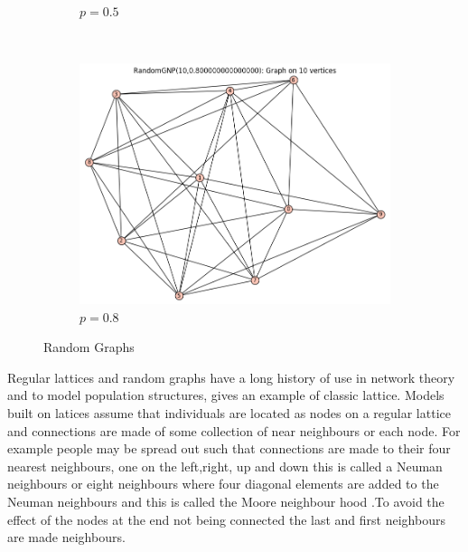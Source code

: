 \begin{figure}[h]
\begin{subfigure}[b]{0.3\textwidth}
        \caption{$p=0.5$}
        \label{fig:b}
    \end{subfigure}
    ~ %
    \begin{subfigure}[b]{0.3\textwidth}
        \includegraphics[width=\textwidth]{images/rgraph3}
        \caption{$p= 0.8$}
        \label{fig:c}
    \end{subfigure}
    \caption{Random Graphs}\label{fig:randomgraphs}
\end{figure}




Regular lattices and random graphs have a long history of use in network theory and to model population structures,\cite{harris1974contact}  gives an example of classic lattice. Models built on latices assume that individuals are located as nodes on a regular lattice and connections are made of some collection of near neighbours or each node.
For example people may be spread out such that connections are made to their four nearest neighbours, one on the left,right, up and down this is called a Neuman neighbours  or eight neighbours where four diagonal elements are added to the Neuman neighbours and this is called the Moore neighbour hood \citep{lloyd2006infection}.To avoid the effect of the nodes at the end not being connected the last and first neighbours are made neighbours.

